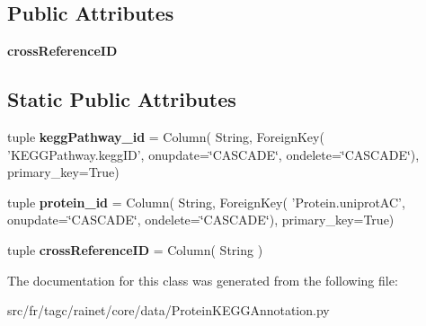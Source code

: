 \subsection*{Public Attributes}
\begin{DoxyCompactItemize}
\item 
\hypertarget{classsrc_1_1fr_1_1tagc_1_1rainet_1_1core_1_1data_1_1ProteinKEGGAnnotation_1_1ProteinKEGGAnnotation_ab00686801e452dc2fd400b2cefb87ac9}{{\bfseries cross\-Reference\-I\-D}}\label{classsrc_1_1fr_1_1tagc_1_1rainet_1_1core_1_1data_1_1ProteinKEGGAnnotation_1_1ProteinKEGGAnnotation_ab00686801e452dc2fd400b2cefb87ac9}

\end{DoxyCompactItemize}
\subsection*{Static Public Attributes}
\begin{DoxyCompactItemize}
\item 
\hypertarget{classsrc_1_1fr_1_1tagc_1_1rainet_1_1core_1_1data_1_1ProteinKEGGAnnotation_1_1ProteinKEGGAnnotation_a639c7b547b2732d8553ad6c45ec5fc57}{tuple {\bfseries kegg\-Pathway\-\_\-id} = Column( String, Foreign\-Key( 'K\-E\-G\-G\-Pathway.\-kegg\-I\-D', onupdate=\char`\"{}C\-A\-S\-C\-A\-D\-E\char`\"{}, ondelete=\char`\"{}C\-A\-S\-C\-A\-D\-E\char`\"{}), primary\-\_\-key=True)}\label{classsrc_1_1fr_1_1tagc_1_1rainet_1_1core_1_1data_1_1ProteinKEGGAnnotation_1_1ProteinKEGGAnnotation_a639c7b547b2732d8553ad6c45ec5fc57}

\item 
\hypertarget{classsrc_1_1fr_1_1tagc_1_1rainet_1_1core_1_1data_1_1ProteinKEGGAnnotation_1_1ProteinKEGGAnnotation_ade5481a917c07491f26762bb8b65c7c5}{tuple {\bfseries protein\-\_\-id} = Column( String, Foreign\-Key( 'Protein.\-uniprot\-A\-C', onupdate=\char`\"{}C\-A\-S\-C\-A\-D\-E\char`\"{}, ondelete=\char`\"{}C\-A\-S\-C\-A\-D\-E\char`\"{}), primary\-\_\-key=True)}\label{classsrc_1_1fr_1_1tagc_1_1rainet_1_1core_1_1data_1_1ProteinKEGGAnnotation_1_1ProteinKEGGAnnotation_ade5481a917c07491f26762bb8b65c7c5}

\item 
\hypertarget{classsrc_1_1fr_1_1tagc_1_1rainet_1_1core_1_1data_1_1ProteinKEGGAnnotation_1_1ProteinKEGGAnnotation_a44697f3cf69e964fd804a8796727c7b1}{tuple {\bfseries cross\-Reference\-I\-D} = Column( String )}\label{classsrc_1_1fr_1_1tagc_1_1rainet_1_1core_1_1data_1_1ProteinKEGGAnnotation_1_1ProteinKEGGAnnotation_a44697f3cf69e964fd804a8796727c7b1}

\end{DoxyCompactItemize}


The documentation for this class was generated from the following file\-:\begin{DoxyCompactItemize}
\item 
src/fr/tagc/rainet/core/data/Protein\-K\-E\-G\-G\-Annotation.\-py\end{DoxyCompactItemize}
